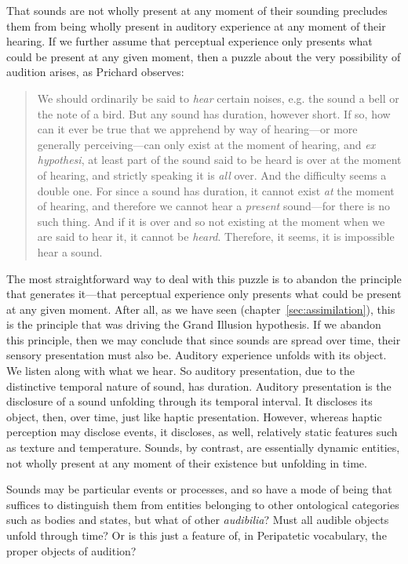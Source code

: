 That sounds are not wholly present at any moment of their sounding precludes them from being wholly present in auditory experience at any moment of their hearing. If we further assume that perceptual experience only presents what could be present at any given moment, then a puzzle about the very possibility of audition arises, as Prichard observes: 
\begin{quote}
	We should ordinarily be said to \emph{hear} certain noises, e.g. the sound a bell or the note of a bird. But any sound has duration, however short. If so, how can it ever be true that we apprehend by way of hearing---or more generally perceiving---can only exist at the moment of hearing, and \emph{ex hypothesi}, at least part of the sound said to be heard is over at the moment of hearing, and strictly speaking it is \emph{all} over. And the difficulty seems a double one. For since a sound has duration, it cannot exist \emph{at} the moment of hearing, and therefore we cannot hear a \emph{present} sound---for there is no such thing. And if it is over and so not existing at the moment when we are said to hear it, it cannot be \emph{heard}. Therefore, it seems, it is impossible hear a sound. \citep[47]{Prichard:1950ly}
\end{quote}
The most straightforward way to deal with this puzzle is to abandon the principle that generates it---that perceptual experience only presents what could be present at any given moment. After all, as we have seen (chapter~\ref{sec:assimilation}), this is the principle that was driving the Grand Illusion hypothesis. If we abandon this principle, then we may conclude that since sounds are spread over time, their sensory presentation must also be. Auditory experience unfolds with its object. We listen along with what we hear. So auditory presentation, due to the distinctive temporal nature of sound, has duration. Auditory presentation is the disclosure of a sound unfolding through its temporal interval. It discloses its object, then, over time, just like haptic presentation. However, whereas haptic perception may disclose events, it discloses, as well, relatively static features such as texture and temperature. Sounds, by contrast, are essentially dynamic entities, not wholly present at any moment of their existence but unfolding in time. 

Sounds may be particular events or processes, and so have a mode of being that suffices to distinguish them from entities belonging to other ontological categories such as bodies and states, but what of other \emph{audibilia}? Must all audible objects unfold through time? Or is this just a feature of, in Peripatetic vocabulary, the proper objects of audition? 

